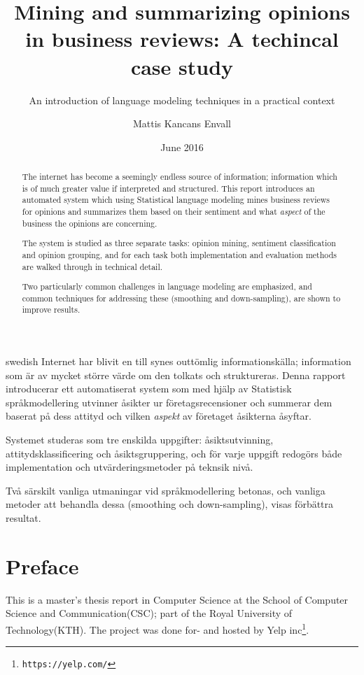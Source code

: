 \documentclass[a4paper,11pt]{kth-mag}
\title{Mining and summarizing opinions in business reviews: A techincal case study}
\subtitle{An introduction of language modeling techniques in a practical context}
\author{Mattis Kancans Envall}
\date{June 2016}
\begin{document}
\frontmatter
\pagestyle{empty}
\removepagenumbers
\maketitle
{}
\begin{abstract}
  The internet has become a seemingly endless source of information;
  information which is of much greater value if interpreted and structured.
  This report introduces an automated system which using Statistical language modeling
  mines business reviews for opinions and summarizes them
  based on their sentiment and what \emph{aspect} of the business the opinions are concerning.
  
  The system is studied as three separate tasks: opinion mining, sentiment classification and opinion grouping,
  and for each task both implementation and evaluation methods are walked through in technical detail.

  Two particularly common challenges in language modeling are emphasized, and common techniques for addressing these
  (smoothing and down-sampling), are shown to improve results.
\end{abstract}


\clearpage
\begin{foreignabstract}{swedish}
  Internet har blivit en till synes outtömlig informationskälla; information som är av mycket större
  värde om den tolkats och struktureras.
  Denna rapport introducerar ett automatiserat system som med hjälp av Statistisk språkmodellering
  utvinner åsikter ur företagsrecensioner och summerar dem
  baserat på dess attityd och vilken \emph{aspekt} av företaget åsikterna åsyftar.

  Systemet studeras som tre enskilda uppgifter: åsiktsutvinning, attitydsklassificering och åsiktsgruppering,
  och för varje uppgift redogörs både implementation och utvärderingsmetoder på teknsik nivå.

  Två särskilt vanliga utmaningar vid språkmodellering betonas, och vanliga metoder att behandla dessa (smoothing och down-sampling), visas förbättra resultat.
\end{foreignabstract}
\clearpage

\section*{Preface}
This is a master's thesis report in Computer Science at the School of Computer Science and Communication(CSC); part of the Royal University of Technology(KTH). The project was done for- and hosted by Yelp inc\footnote{\texttt{https://yelp.com/}}.
\end{document}
